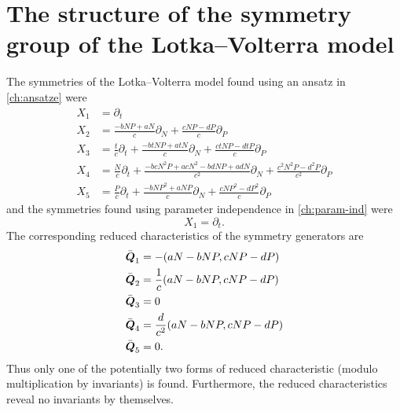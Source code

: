 \section{The structure of the symmetry group of the Lotka--Volterra model}

The symmetries of the Lotka--Volterra model found using an ansatz in \cref{ch:ansatze} were
\begin{align*}
  X_1 &= \partial_t \\
  X_2 &= \frac{-bNP + aN}{c} \partial_N + \frac{cNP - dP}{c} \partial_P \\
  X_3 &= \frac{t}{c} \partial_t + \frac{-btNP + atN}{c} \partial_N + \frac{ctNP - dtP}{c} \partial_P \\
  X_4 &= \frac{N}{c} \partial_t + \frac{-bcN^2P + acN^2 - bdNP + adN}{c^2} \partial_N + \frac{c^2N^2P - d^2P}{c^2} \partial_P \\
  X_5 &= \frac{P}{c} \partial_t + \frac{-bNP^2 + aNP}{c} \partial_N + \frac{cNP^2 - dP^2}{c} \partial_P
\end{align*}
and the symmetries found using parameter independence in \cref{ch:param-ind} were
\begin{equation*}
  X_1 = \partial_t.
\end{equation*}
The corresponding reduced characteristics of the symmetry generators are
\begin{align*}
  \bar{\vect{Q}}_1 &= - \left(a N - b N P, c N P - d P\right) \\
  \bar{\vect{Q}}_2 &= \frac{1}{c} \left(a N - b N P, c N P - d P\right) \\
  \bar{\vect{Q}}_3 &= 0 \\
  \bar{\vect{Q}}_4 &= \frac{d}{c^2}\left(aN- bNP, cNP - dP\right) \\
  \bar{\vect{Q}}_5 &= 0.
\end{align*}
Thus only one of the potentially two forms of reduced characteristic (modulo multiplication by invariants) is found.
Furthermore, the reduced characteristics reveal no invariants by themselves.

